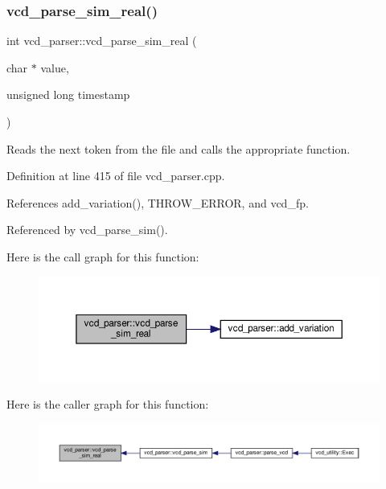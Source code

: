 \subsubsection{\texorpdfstring{vcd\+\_\+parse\+\_\+sim\+\_\+real()}{vcd\_parse\_sim\_real()}}
{\footnotesize\ttfamily int vcd\+\_\+parser\+::vcd\+\_\+parse\+\_\+sim\+\_\+real (\begin{DoxyParamCaption}\item[{char $\ast$}]{value,  }\item[{unsigned long}]{timestamp }\end{DoxyParamCaption})\hspace{0.3cm}{\ttfamily [private]}}



Reads the next token from the file and calls the appropriate function. 



Definition at line 415 of file vcd\+\_\+parser.\+cpp.



References add\+\_\+variation(), T\+H\+R\+O\+W\+\_\+\+E\+R\+R\+OR, and vcd\+\_\+fp.



Referenced by vcd\+\_\+parse\+\_\+sim().

Here is the call graph for this function\+:
\nopagebreak
\begin{figure}[H]
\begin{center}
\leavevmode
\includegraphics[width=350pt]{d2/d25/classvcd__parser_a0cec69a0f950aa8fb3cf7804b6f89045_cgraph}
\end{center}
\end{figure}
Here is the caller graph for this function\+:
\nopagebreak
\begin{figure}[H]
\begin{center}
\leavevmode
\includegraphics[width=350pt]{d2/d25/classvcd__parser_a0cec69a0f950aa8fb3cf7804b6f89045_icgraph}
\end{center}
\end{figure}
\mbox{\label{classvcd__parser_aa27eaa7b2cd3eb398d6b06a6253cc3be}} 
